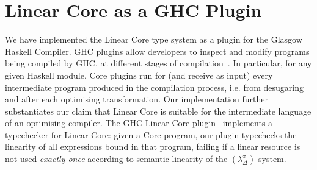 \documentclass[acmsmall,review,anonymous,screen]{acmart}
\newcommand{\notyetcolorname}{light yellow}
\begin{document}



\section{Linear Core as a GHC Plugin\label{sec:discuss:implementation}}

We have implemented the Linear Core type system as a plugin for the Glasgow
Haskell Compiler.
GHC plugins allow developers to inspect and modify programs being compiled by
GHC, at different stages of compilation~\cite{10.1145/3331545.3342599}.
%
In particular, for any given Haskell module, Core plugins run for (and receive
as input) every intermediate program produced in the compilation process, i.e.
from desugaring and after each optimising transformation.
%
Our implementation further substantiates our claim that Linear Core is
suitable for the intermediate language of an optimising compiler.
The GHC Linear Core plugin~\cite{cite:linear-core-plugin} implements a
typechecker for Linear Core: given a Core program, our plugin typechecks the
linearity of all expressions bound in that program, failing if a linear
resource is not used \emph{exactly once} according to semantic linearity of the
$(\lambda^\pi_\Delta)$ system.
%

\end{document}

